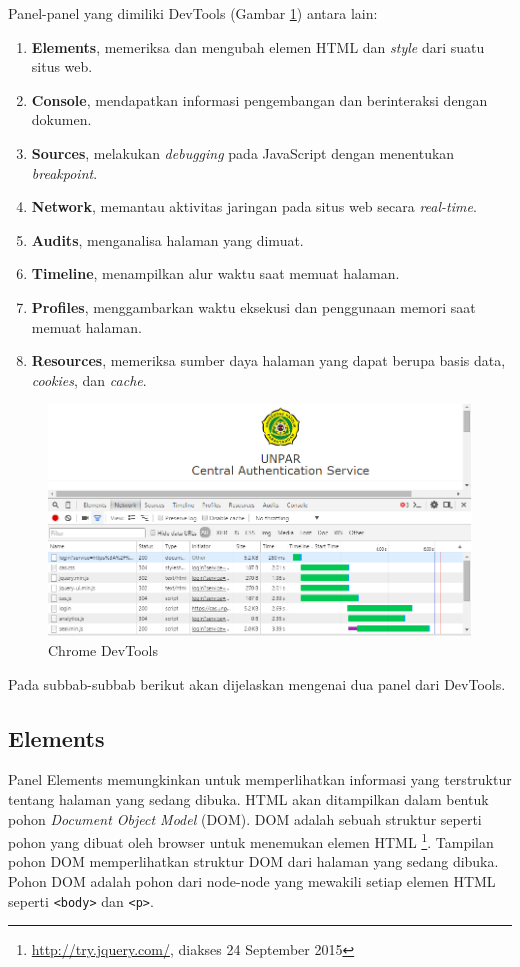 Panel-panel yang dimiliki DevTools (Gambar \ref{fig:2_chrome_devtools}) antara lain:
\begin{enumerate}
	\item \textbf{Elements}, memeriksa dan mengubah elemen HTML dan \textit{style} dari suatu situs web.
	\item \textbf{Console}, mendapatkan informasi pengembangan dan berinteraksi dengan dokumen.
	\item \textbf{Sources}, melakukan \textit{debugging} pada JavaScript dengan menentukan \textit{breakpoint}.
	\item \textbf{Network}, memantau aktivitas jaringan pada situs web secara \textit{real-time}.
	\item \textbf{Audits}, menganalisa halaman yang dimuat.
	\item \textbf{Timeline}, menampilkan alur waktu saat memuat halaman.
	\item \textbf{Profiles}, menggambarkan waktu eksekusi dan penggunaan memori saat memuat halaman.
	\item \textbf{Resources}, memeriksa sumber daya halaman yang dapat berupa basis data, \textit{cookies}, dan \textit{cache}.
\end{enumerate}

\begin{figure}[H]
	\centering
	\includegraphics[scale=0.5]{Gambar/chrome-devtools}
	\caption{Chrome DevTools} 
	\label{fig:2_chrome_devtools}
\end{figure}

Pada subbab-subbab berikut akan dijelaskan mengenai dua panel dari DevTools.

\subsection{Elements}
Panel Elements memungkinkan untuk memperlihatkan informasi yang terstruktur tentang halaman yang sedang dibuka. HTML akan ditampilkan dalam bentuk pohon \textit{Document Object Model} (DOM). DOM adalah sebuah struktur seperti pohon yang dibuat oleh browser untuk menemukan elemen HTML \footnote{\url{http://try.jquery.com/}, diakses 24 September 2015}. Tampilan pohon DOM memperlihatkan struktur DOM dari halaman yang sedang dibuka. Pohon DOM adalah pohon dari node-node yang mewakili setiap elemen HTML seperti \texttt{<body>} dan \texttt{<p>}. 

